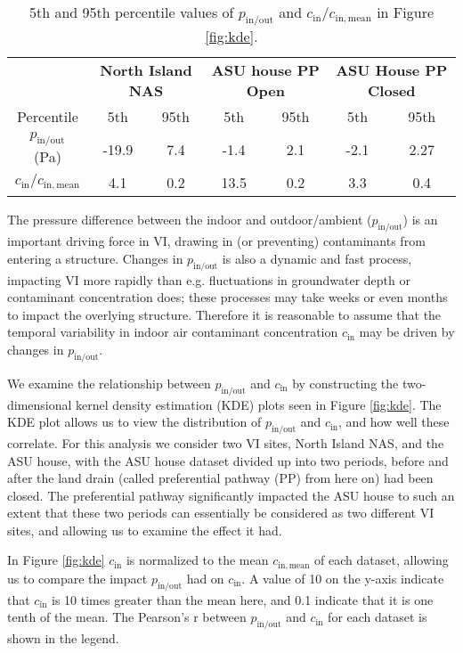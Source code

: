 \documentclass[journal=esthag,manuscript=article]{achemso}
\begin{document}
\begin{table}[htb!]
  \caption{5th and 95th percentile values of $p_\mathrm{in/out}$ and $c_\mathrm{in}/c_\mathrm{in,mean}$ in Figure \ref{fig:kde}.}\label{tbl:percentiles}
  \begin{tabular}{c c c c c c c}
    \toprule
    & \multicolumn{2}{c|}{\textbf{North Island NAS}} & \multicolumn{2}{c|}{\textbf{ASU house PP Open}} & \multicolumn{2}{c}{\textbf{ASU House PP Closed}} \\
    Percentile & 5th & 95th & 5th & 95th & 5th & 95th \\
    $p_\mathrm{in/out}$ (Pa) & -19.9 & 7.4 & -1.4 & 2.1 & -2.1 & 2.27 \\
    $c_\mathrm{in}/c_\mathrm{in,mean}$ & 4.1 & 0.2 & 13.5 & 0.2 & 3.3 & 0.4 \\
    \bottomrule
  \end{tabular}
\end{table}

The pressure difference between the indoor and outdoor/ambient ($p_\mathrm{in/out}$) is an important driving force in VI, drawing in (or preventing) contaminants from entering a structure. %
Changes in $p_\mathrm{in/out}$ is also a dynamic and fast process, impacting VI more rapidly than e.g. fluctuations in groundwater depth or contaminant concentration does; these processes may take weeks or even months to impact the overlying structure.
Therefore it is reasonable to assume that the temporal variability in indoor air contaminant concentration $c_\mathrm{in}$ may be driven by changes in $p_\mathrm{in/out}$.

We examine the relationship between $p_\mathrm{in/out}$ and $c_\mathrm{in}$  by constructing the two-dimensional kernel density estimation (KDE) plots seen in Figure \ref{fig:kde}.
The KDE plot allows us to view the distribution of $p_\mathrm{in/out}$ and $c_\mathrm{in}$, and how well these correlate.
For this analysis we consider two VI sites, North Island NAS, and the ASU house, with the ASU house dataset divided up into two periods, before and after the land drain (called preferential pathway (PP) from here on) had been closed.
The preferential pathway significantly impacted the ASU house to such an extent that these two periods can essentially be considered as two different VI sites, and allowing us to examine the effect it had.

In Figure \ref{fig:kde} $c_\mathrm{in}$ is normalized to the mean $c_\mathrm{in,mean}$ of each dataset, allowing us to compare the impact $p_\mathrm{in/out}$ had on $c_\mathrm{in}$.
A value of 10 on the y-axis indicate that $c_\mathrm{in}$ is 10 times greater than the mean here, and 0.1 indicate that it is one tenth of the mean.
The Pearson's r between $p_\mathrm{in/out}$ and $c_\mathrm{in}$ for each dataset is shown in the legend.
\end{document}
